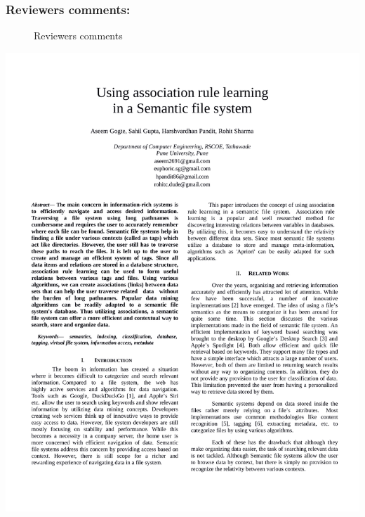 \subsubsection{Reviewers comments:}
\begin{figure}[htb]
\centering
\setlength\fboxsep{0pt}
\setlength\fboxrule{0.5pt}
\caption{Reviewers comments}
\label{fig:dfd0}
\end{figure}
\newpage
\includegraphics[page=1,scale=0.75]{./appendix/sem2.pdf}
	
